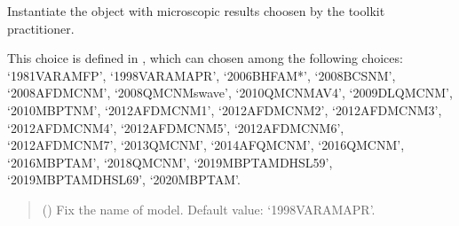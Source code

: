 \documentclass[letterpaper,10pt,english]{sphinxmanual}
\begin{document}
\begin{fulllineitems}
\label{\detokenize{source/api/setup_micro:nucleardatapy.setup_micro.SetupMicro}}
\pysigstartsignatures
{}
\pysigstopsignatures
\sphinxAtStartPar
Instantiate the object with microscopic results choosen     by the toolkit practitioner.

\sphinxAtStartPar
This choice is defined in , which can chosen among     the following choices:     ‘1981\sphinxhyphen{}VAR\sphinxhyphen{}AM\sphinxhyphen{}FP’, ‘1998\sphinxhyphen{}VAR\sphinxhyphen{}AM\sphinxhyphen{}APR’, ‘2006\sphinxhyphen{}BHF\sphinxhyphen{}AM*’, ‘2008\sphinxhyphen{}BCS\sphinxhyphen{}NM’, ‘2008\sphinxhyphen{}AFDMC\sphinxhyphen{}NM’,     ‘2008\sphinxhyphen{}QMC\sphinxhyphen{}NM\sphinxhyphen{}swave’, ‘2010\sphinxhyphen{}QMC\sphinxhyphen{}NM\sphinxhyphen{}AV4’, ‘2009\sphinxhyphen{}DLQMC\sphinxhyphen{}NM’, ‘2010\sphinxhyphen{}MBPT\sphinxhyphen{}NM’,     ‘2012\sphinxhyphen{}AFDMC\sphinxhyphen{}NM\sphinxhyphen{}1’, ‘2012\sphinxhyphen{}AFDMC\sphinxhyphen{}NM\sphinxhyphen{}2’, ‘2012\sphinxhyphen{}AFDMC\sphinxhyphen{}NM\sphinxhyphen{}3’, ‘2012\sphinxhyphen{}AFDMC\sphinxhyphen{}NM\sphinxhyphen{}4’,     ‘2012\sphinxhyphen{}AFDMC\sphinxhyphen{}NM\sphinxhyphen{}5’, ‘2012\sphinxhyphen{}AFDMC\sphinxhyphen{}NM\sphinxhyphen{}6’, ‘2012\sphinxhyphen{}AFDMC\sphinxhyphen{}NM\sphinxhyphen{}7’,     ‘2013\sphinxhyphen{}QMC\sphinxhyphen{}NM’, ‘2014\sphinxhyphen{}AFQMC\sphinxhyphen{}NM’, ‘2016\sphinxhyphen{}QMC\sphinxhyphen{}NM’, ‘2016\sphinxhyphen{}MBPT\sphinxhyphen{}AM’,     ‘2018\sphinxhyphen{}QMC\sphinxhyphen{}NM’, ‘2019\sphinxhyphen{}MBPT\sphinxhyphen{}AM\sphinxhyphen{}DHSL59’, ‘2019\sphinxhyphen{}MBPT\sphinxhyphen{}AM\sphinxhyphen{}DHSL69’,     ‘2020\sphinxhyphen{}MBPT\sphinxhyphen{}AM’.
\begin{quote}\begin{description}
\sphinxAtStartPar
{} (\sphinxstyleliteralemphasis{\sphinxupquote{, }}) \textendash{} Fix the name of model. Default value: ‘1998\sphinxhyphen{}VAR\sphinxhyphen{}AM\sphinxhyphen{}APR’.


\end{description}
\end{quote}
\end{fulllineitems}
\end{document}
